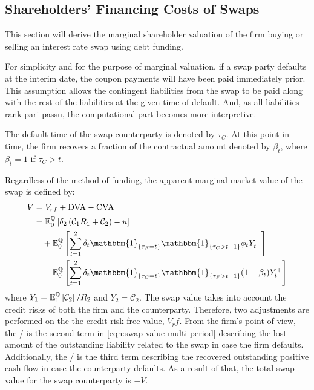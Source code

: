 \documentclass[main.tex]{subfiles}
\begin{document}
    \subsection{Shareholders' Financing Costs of Swaps}
    \label{sec:unsecured-swap-valuation}
        This section will derive the marginal shareholder valuation of the firm
        buying or selling an interest rate swap using debt funding.    

        For simplicity and for the purpose of marginal valuation,
        if a swap party defaults at the interim date, the coupon payments will have been paid immediately prior.
        This assumption allows the contingent liabilities from the swap to be paid along with the rest of the liabilities at the given time of default.
        And, as all liabilities rank pari passu, the computational part becomes more interpretive.

        The default time of the swap counterparty is denoted by $\tau_{C}$.
        At this point in time, the firm recovers a fraction of the contractual amount denoted by $\beta_{t}$, where $\beta_{t} = 1$ if $\tau_{C}>t$.

        Regardless of the method of funding, the apparent marginal market value of the swap is defined by:
        \begin{align}
            V &= V_{rf} + \DVA/ - \CVA/
            \nonumber
            \\
            &=
            \mathbb{E}_{0}^{\rnmeasure}\left[
                \delta_2 \left(\mathcal{C}_{1} R_{1} + \mathcal{C}_{2}\right)
                - u
            \right]
            \nonumber
            \\
            &\quad +
            \mathbb{E}_{0}^{\rnmeasure}\left[
                \sum_{t=1}^{2} \delta_{t} \mathbbm{1}_{\{\tau_{F} = t\}}\mathbbm{1}_{\{\tau_{C}>t-1\}} \phi_t Y_{t}^{-} 
            \right]
            \nonumber
            \\
            &\quad -
            \mathbb{E}_{0}^{\rnmeasure}\left[
                \sum_{t=1}^{2} \delta_{t} \mathbbm{1}_{\{\tau_{C} = t\}}\mathbbm{1}_{\{\tau_{F}>t-1\}} (1-\beta_t) Y_{t}^{+} 
            \right]
            \label{eqn:swap-value-multi-period}
        \end{align}
        where $Y_{1} = \mathbb{E}_{1}^{\mathbb{Q}}\left[\mathcal{C}_{2}\right]/R_{2}$ and $Y_{2} = \mathcal{C}_{2}$.
        The swap value takes into account the credit risks of both the firm and the counterparty.
        Therefore, two adjustments are performed on the the credit risk-free value, $V_rf$.
        From the firm's point of view,
        the \DVA/ is the second term in \cref{eqn:swap-value-multi-period} describing the lost amount of the outstanding liability related to the swap in case the firm defaults.
        Additionally, the \CVA/ is the third term describing the recovered outstanding positive cash flow in case the counterparty defaults.
        As a result of that, the total swap value for the swap counterparty is $-V$.
\end{document}
